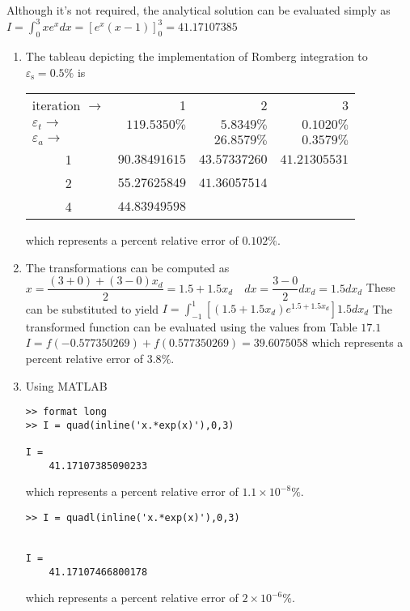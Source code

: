 \documentclass[../main.tex]{subfiles}
\begin{document}
\section{}
 Although it's not required, the analytical solution can be evaluated simply as
	\bigbreak
$\displaystyle I=\int_{0}^{3} x e^{x} d x=\left[e^{x}(x-1)\right]_{0}^{3}=41.17107385$
	\bigbreak
\begin{enumerate}[label=\bfseries(\alph*)]
\item The tableau depicting the implementation of Romberg integration to $\varepsilon_{\mathrm{s}}=0.5 \%$ is
	\bigbreak
\begin{tabular}{lrrr}
iteration $\rightarrow$ & 1 & 2 & 3 \\
$\varepsilon_{t} \rightarrow$ & $119.5350 \%$ & $5.8349 \%$ & $0.1020 \%$ \\
$\varepsilon_{a} \rightarrow$ &  & $26.8579 \%$ & $0.3579 \%$ \\
\multicolumn{1}{c}{1} & $90.38491615$ & $43.57337260$ & $41.21305531$ \\
\multicolumn{1}{c}{2} & $55.27625849$ & $41.36057514$ &  \\
\multicolumn{1}{c}{4} & $44.83949598$ &  &  \\
\end{tabular}
	\bigbreak
which represents a percent relative error of $0.102 \%$.
	\bigbreak
\item The transformations can be computed as
	\bigbreak
$x=\dfrac{(3+0)+(3-0) x_{d}}{2}=1.5+1.5 x_{d} \quad d x=\dfrac{3-0}{2} d x_{d}=1.5 d x_{d}$
	\bigbreak
These can be substituted to yield
	\bigbreak
$\displaystyle I=\int_{-1}^{1}\left[\left(1.5+1.5 x_{d}\right) e^{1.5+1.5 x_{d}}\right] 1.5 d x_{d}$
	\bigbreak
The transformed function can be evaluated using the values from Table $17.1$
	\bigbreak
$I=f(-0.577350269)+f(0.577350269)=39.6075058$
	\bigbreak
which represents a percent relative error of $3.8 \%$.
	\bigbreak
\item Using MATLAB
	\bigbreak
\begin{lstlisting}[numbers=none]
>> format long
>> I = quad(inline('x.*exp(x)'),0,3) 

I =
	41.17107385090233
\end{lstlisting}
	\bigbreak
which represents a percent relative error of $1.1 \times 10^{-8} \%$.
	\bigbreak
\begin{lstlisting}[numbers=none]
>> I = quadl(inline('x.*exp(x)'),0,3)


I =
	41.17107466800178
\end{lstlisting}
	\bigbreak
which represents a percent relative error of $2 \times 10^{-6} \%$.
	\bigbreak
\end{enumerate}
\end{document}

